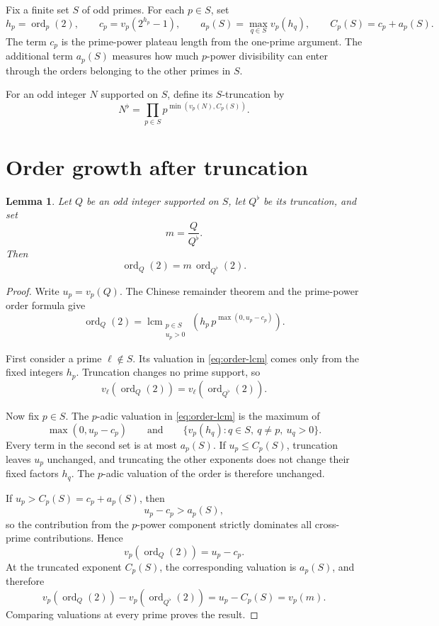 \documentclass[a4paper]{article}
\newtheorem{lemma}[theorem]{Lemma}
\newcommand{\ord}[2][]{\operatorname{ord}_{#1}\!\left(#2\right)}
\begin{document}
Fix a finite set $S$ of odd primes.
For each $p\in S$, set
\begin{equation}\label{eq:thresholds}
	h_p=\ord[p]{2},
	\qquad
	c_p=v_p(2^{h_p}-1),
	\qquad
	a_p(S)=\max_{q\in S}v_p(h_q),
	\qquad
	C_p(S)=c_p+a_p(S).
\end{equation}
The term $c_p$ is the prime-power plateau length from the one-prime argument.
The additional term $a_p(S)$ measures how much $p$-power divisibility can enter through the orders belonging to the other primes in $S$.

For an odd integer $N$ supported on $S$, define its $S$-truncation by
\begin{equation}\label{eq:truncation}
	N^\flat=\prod_{p\in S}p^{\min(v_p(N),C_p(S))}.
\end{equation}

\section{Order growth after truncation}

\begin{lemma}\label{lem:order-truncation}
	Let $Q$ be an odd integer supported on $S$, let $Q^\flat$ be its truncation, and set
	\[
		m=\frac{Q}{Q^\flat}.
	\]
	Then
	\[
		\ord[Q]{2}=m\,\ord[Q^\flat]{2}.
	\]
\end{lemma}

\begin{proof}
	Write $u_p=v_p(Q)$.
	The Chinese remainder theorem and the prime-power order formula give
	\begin{equation}\label{eq:order-lcm}
		\ord[Q]{2}
		=
		\mathop{\operatorname{lcm}}_{\substack{p\in S\\u_p>0}}
		\left(h_p\,p^{\max(0,u_p-c_p)}\right).
	\end{equation}

	First consider a prime $\ell\notin S$.
	Its valuation in \eqref{eq:order-lcm} comes only from the fixed integers $h_p$.
	Truncation changes no prime support, so
	\[
		v_\ell\!\left(\ord[Q]{2}\right)
		=
		v_\ell\!\left(\ord[Q^\flat]{2}\right).
	\]

	Now fix $p\in S$.
	The $p$-adic valuation in \eqref{eq:order-lcm} is the maximum of
	\[
		\max(0,u_p-c_p)
		\qquad\text{and}\qquad
		\{v_p(h_q):q\in S,\ q\neq p,\ u_q>0\}.
	\]
	Every term in the second set is at most $a_p(S)$.
	If $u_p\leq C_p(S)$, truncation leaves $u_p$ unchanged, and truncating the other exponents does not change their fixed factors $h_q$.
	The $p$-adic valuation of the order is therefore unchanged.

	If $u_p>C_p(S)=c_p+a_p(S)$, then
	\[
		u_p-c_p>a_p(S),
	\]
	so the contribution from the $p$-power component strictly dominates all cross-prime contributions.
	Hence
	\[
		v_p\!\left(\ord[Q]{2}\right)=u_p-c_p.
	\]
	At the truncated exponent $C_p(S)$, the corresponding valuation is $a_p(S)$, and therefore
	\[
		v_p\!\left(\ord[Q]{2}\right)
		-
		v_p\!\left(\ord[Q^\flat]{2}\right)
		=
		u_p-C_p(S)
		=
		v_p(m).
	\]
	Comparing valuations at every prime proves the result.
\end{proof}
\end{document}
